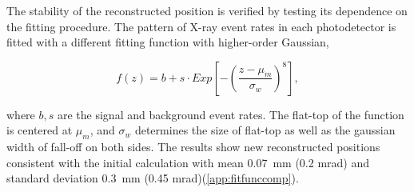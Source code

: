 The stability of the reconstructed position 
is verified by testing its dependence on 
the fitting procedure.
The pattern of X-ray event rates in each photodetector is fitted
with a different fitting function with higher-order Gaussian,

\begin{equation} \label{eqn:supergauss}
    f(z)=b+s\cdot
Exp\left[-\left(\frac{z-\mu_{m}}{\sigma_{w}}\right)^{8}\right],
\end{equation}

where $b,s$ are the signal and background event rates. The 
flat-top of the function is centered at $\mu_m$,
and $\sigma_w$ determines the size  of
flat-top as well as the gaussian width of fall-off
on both sides. 
The results show new reconstructed positions consistent with the initial
calculation with mean 0.07~mm (0.2 mrad) and standard deviation
0.3~mm (0.45 mrad)(\ref{app:fitfunccomp}).







